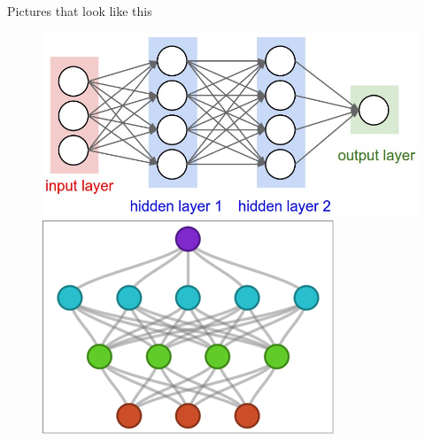 \documentclass[11pt]{beamer}
\begin{document}
\begin{frame}{Pictures that look like this}

\begin{center}
\begin{figure}
\includegraphics[scale=0.2]{0_IlHu39jf2c7QC4kn}
\hspace{5mm}
\includegraphics[scale=0.2]{topdown}

\vspace{5mm}


\end{figure}
\end{center}
\end{frame}
\end{document}
